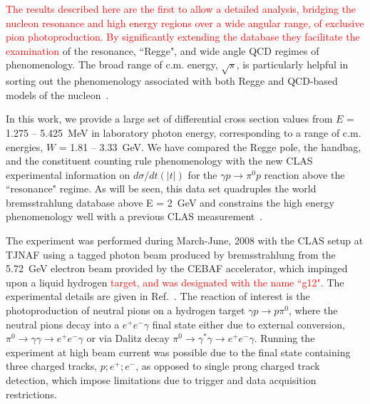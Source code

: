 \documentclass[aps,prc,twocolumn,floatfix,showpacs,preprintnumbers,amsmath,amssymb,superscriptaddress,linenumbers]{revtex4-1}
\begin{document}
\textcolor{red}{The results described here are the first to allow a detailed analysis, bridging the nucleon resonance and high energy regions over a wide angular range, of exclusive pion photoproduction. By significantly extending the database they facilitate
the examination}
%		 
		of the resonance, ``Regge", and wide angle QCD regimes of phenomenology. The 
		broad range of c.m. energy, $\sqrt{s}$, is particularly helpful in 
		sorting out the phenomenology associated with both Regge and QCD-based 
		models of the nucleon~\cite{Kroll:2017hym}.

In this work, we provide a large set of differential 
cross section values from $E$ = 1.275 -- 5.425~MeV in laboratory photon 
energy, corresponding to a range of c.m. energies, $W$ = 1.81 -- 
3.33~GeV.  We have compared the Regge pole, the handbag, and the 
constituent counting rule phenomenology with the new CLAS experimental 
information on $d\sigma/dt(|t|)$ for the $\gamma p\rightarrow\pi^0p$ 
reaction above the ``resonance" regime. As will be seen, this data 
set quadruples the world bremsstrahlung database above E = 2~GeV and 
constrains the high energy phenomenology well with a previous CLAS 
measurement~\cite{Dugger:2007bt}.


The experiment was performed during March-June, 2008
with the CLAS setup at TJNAF using a tagged photon beam produced by 
bremsstrahlung from the 5.72~GeV electron beam provided by the CEBAF 
accelerator, which impinged upon a liquid hydrogen \textcolor{red}{target,
and was designated with the name ``g12".} 
The experimental details are given in Ref.~\cite{g12}. The reaction 
of interest is the photoproduction of neutral pions on a hydrogen 
target $\gamma p\rightarrow p\pi^0$, 
where the neutral pions decay into a $e^+e^-\gamma$ final state either due to external conversion, $\pi^0 \rightarrow\gamma\gamma 
\rightarrow e^+e^-\gamma$ or via Dalitz decay $\pi^0
\rightarrow\gamma^\ast\gamma\rightarrow e^+e^-\gamma$. Running the 
experiment at high beam current was possible due to the final state 
containing three charged tracks, $p;e^+;e^-$, as opposed to single 
prong charged track detection, which impose limitations due to trigger 
and data acquisition restrictions.
\end{document}
